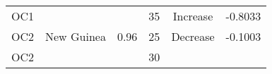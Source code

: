 \documentclass[]{article}
\begin{document}
\begin{longtable}[]{@{}clrccr@{}}
\begin{minipage}[t]{0.08\columnwidth}
OC1\strut
\end{minipage} & \begin{minipage}[t]{0.29\columnwidth}\raggedright\strut
\strut
\end{minipage} & \begin{minipage}[t]{0.11\columnwidth}\raggedleft\strut
\strut
\end{minipage} & \begin{minipage}[t]{0.10\columnwidth}\centering\strut
35\strut
\end{minipage} & \begin{minipage}[t]{0.16\columnwidth}\centering\strut
Increase\strut
\end{minipage} & \begin{minipage}[t]{0.09\columnwidth}\raggedleft\strut
-0.8033\strut
\end{minipage}\tabularnewline
\begin{minipage}[t]{0.08\columnwidth}\centering\strut
OC2\strut
\end{minipage} & \begin{minipage}[t]{0.29\columnwidth}\raggedright\strut
New Guinea\strut
\end{minipage} & \begin{minipage}[t]{0.11\columnwidth}\raggedleft\strut
0.96\strut
\end{minipage} & \begin{minipage}[t]{0.10\columnwidth}\centering\strut
25\strut
\end{minipage} & \begin{minipage}[t]{0.16\columnwidth}\centering\strut
Decrease\strut
\end{minipage} & \begin{minipage}[t]{0.09\columnwidth}\raggedleft\strut
-0.1003\strut
\end{minipage}\tabularnewline
\begin{minipage}[t]{0.08\columnwidth}\centering\strut
OC2\strut
\end{minipage} & \begin{minipage}[t]{0.29\columnwidth}\raggedright\strut
\strut
\end{minipage} & \begin{minipage}[t]{0.11\columnwidth}\raggedleft\strut
\strut
\end{minipage} & \begin{minipage}[t]{0.10\columnwidth}\centering\strut
30\strut
\end{minipage} & \begin{minipage}[t]{0.16\columnwidth}\centering\strut

\end{minipage}
\end{longtable}
\end{document}
